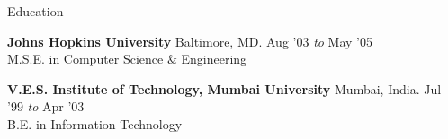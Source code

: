 \documentclass{resume} %
\begin{document}

\begin{rSection}{Education}

{\bf Johns Hopkins University} \hfill Baltimore, MD. Aug '03 {\em to} May '05 \\ 
M.S.E. in Computer Science \& Engineering


{\bf V.E.S. Institute of Technology, Mumbai University} \hfill Mumbai, India. Jul '99 {\em to} Apr '03 \\ 
B.E. in Information Technology

\end{rSection}





\end{document}
